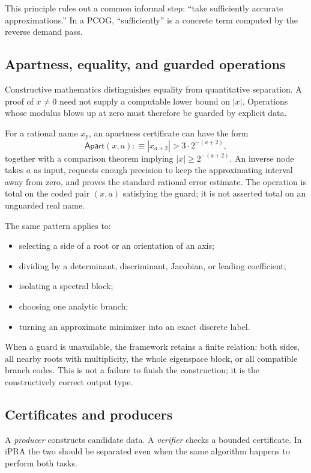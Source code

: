 This principle rules out a common informal step: ``take sufficiently accurate
approximations.''  In a PCOG, ``sufficiently'' is a concrete term computed by
the reverse demand pass.

\subsection{Apartness, equality, and guarded operations}

Constructive mathematics distinguishes equality from quantitative
separation.  A proof of \(x\neq0\) need not supply a computable lower bound on
\(|x|\).  Operations whose modulus blows up at zero must therefore be guarded
by explicit data.

For a rational name \(x_p\), an apartness certificate can have the form
\[
  \mathsf{Apart}(x,a) :\equiv |x_{a+2}|>3\cdot 2^{-(a+2)},
\]
together with a comparison theorem implying \(|x|\geq 2^{-(a+2)}\).  An
inverse node takes \(a\) as input, requests enough precision to keep the
approximating interval away from zero, and proves the standard rational error
estimate.  The operation is total on the coded pair \((x,a)\) satisfying the
guard; it is not asserted total on an unguarded real name.

The same pattern applies to:
\begin{itemize}
\item selecting a side of a root or an orientation of an axis;
\item dividing by a determinant, discriminant, Jacobian, or leading
coefficient;
\item isolating a spectral block;
\item choosing one analytic branch;
\item turning an approximate minimizer into an exact discrete label.
\end{itemize}

When a guard is unavailable, the framework retains a finite relation: both
sides, all nearby roots with multiplicity, the whole eigenspace block, or all
compatible branch codes.  This is not a failure to finish the construction;
it is the constructively correct output type.

\subsection{Certificates and producers}

A \emph{producer} constructs candidate data.  A \emph{verifier} checks a
bounded certificate.  In iPRA the two should be separated even when the same
algorithm happens to perform both tasks.

